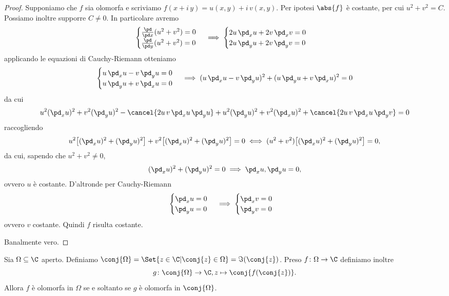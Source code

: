 \begin{proof}
	\graffito{\(\Rightarrow)\)}Supponiamo che \(f\) sia olomorfa e scriviamo \(f(x+i\,y) = u(x,y)+i\,v(x,y)\).
	Per ipotesi \(\abs{f}\) è costante, per cui \(u^2+v^2 = C\). Possiamo inoltre supporre \(C\neq 0\).
	In particolare avremo
	\[
		\begin{cases}
			\frac{\pd}{\pd x}(u^2+v^2) = 0 \\
			\frac{\pd}{\pd y}(u^2+v^2) = 0
		\end{cases}
		\implies
		\begin{cases}
			2u\,\pd_x u + 2v\,\pd_x v = 0 \\
			2u\,\pd_y u + 2v\,\pd_y v = 0
		\end{cases}
	\]
	applicando le equazioni di Cauchy-Riemann otteniamo
	\[
		\begin{cases}
			u\,\pd_x u - v\,\pd_y u = 0 \\
			u\,\pd_y u + v\,\pd_x u = 0
		\end{cases}
		\implies (u\,\pd_x u- v\,\pd_y u)^2 + (u\,\pd_y u+v\,\pd_x u)^2 =0
	\]
	da cui
	\[
		\begin{split}
			u^2 (\pd_x u)^2 + v^2 (\pd_y u)^2 - \cancel{2u\,v\,\pd_x u\,\pd_y u} + u^2(\pd_y u)^2 + v^2 (\pd_x u)^2 + \cancel{2u\,v\,\pd_x u\,\pd_y v} = 0
		\end{split}
	\]
	raccogliendo
	\[
		u^2\big[(\pd_x u)^2 + (\pd_y u)^2\big] + v^2\big[(\pd_x u)^2 + (\pd_y u)^2\big] = 0 \iff (u^2+v^2)\big[(\pd_x u)^2 + (\pd_y u)^2\big] = 0,
	\]
	da cui, sapendo che \(u^2+v^2 \neq 0\),
	\[
		(\pd_x u)^2 + (\pd_y u)^2 = 0 \implies \pd_x u,\pd_y u =0,
	\]
	ovvero \(u\) è costante.
	D'altronde per Cauchy-Riemann
	\[
		\begin{cases}
			\pd_x u = 0 \\
			\pd_y u = 0
		\end{cases}
		\implies
		\begin{cases}
			\pd_x v = 0 \\
			\pd_y v = 0
		\end{cases}
	\]
	ovvero \(v\) costante.
	Quindi \(f\) risulta costante.

	\graffito{\(\Leftarrow)\)}Banalmente vero.
\end{proof}

\begin{exeN}[Esercitazione 04/10]\label{exe:olomorfiaEstensioneSchwarz}
	Sia \(\Omega\subseteq \C\) aperto.
	Definiamo \(\conj{\Omega} = \Set{z\in \C | \conj{z} \in \Omega} = \Im(\conj{z})\).
	Preso \(f\colon \Omega \to \C\) definiamo inoltre
	\[
		g\colon \conj{\Omega} \to \C, z \mapsto \conj{f(\conj{z})}.
	\]
	Allora \(f\) è olomorfa in \(\Omega\) se e soltanto se \(g\) è olomorfa in \(\conj{\Omega}\).
\end{exeN}

